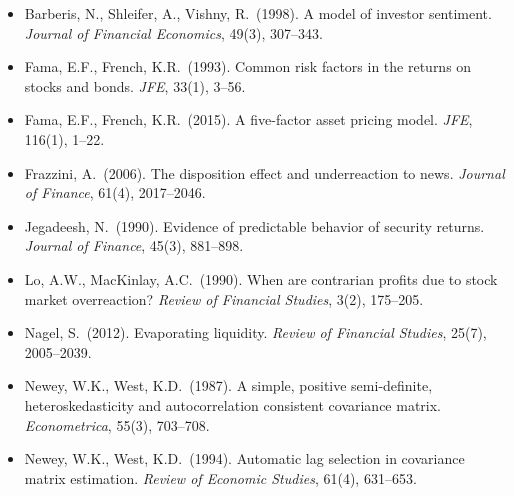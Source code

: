 \documentclass[11pt]{article}
\begin{document}
\begin{itemize}
\item Barberis, N., Shleifer, A., Vishny, R.\ (1998). A model of investor
sentiment. \textit{Journal of Financial Economics}, 49(3), 307--343.
\item Fama, E.F., French, K.R.\ (1993). Common risk factors in the returns
on stocks and bonds. \textit{JFE}, 33(1), 3--56.
\item Fama, E.F., French, K.R.\ (2015). A five-factor asset pricing model.
\textit{JFE}, 116(1), 1--22.
\item Frazzini, A.\ (2006). The disposition effect and underreaction to
news. \textit{Journal of Finance}, 61(4), 2017--2046.
\item Jegadeesh, N.\ (1990). Evidence of predictable behavior of security
returns. \textit{Journal of Finance}, 45(3), 881--898.
\item Lo, A.W., MacKinlay, A.C.\ (1990). When are contrarian profits due
to stock market overreaction? \textit{Review of Financial Studies}, 3(2),
175--205.
\item Nagel, S.\ (2012). Evaporating liquidity. \textit{Review of Financial
Studies}, 25(7), 2005--2039.
\item Newey, W.K., West, K.D.\ (1987). A simple, positive semi-definite,
heteroskedasticity and autocorrelation consistent covariance matrix.
\textit{Econometrica}, 55(3), 703--708.
\item Newey, W.K., West, K.D.\ (1994). Automatic lag selection in
covariance matrix estimation. \textit{Review of Economic Studies}, 61(4),
631--653.
\end{itemize}
\end{document}
